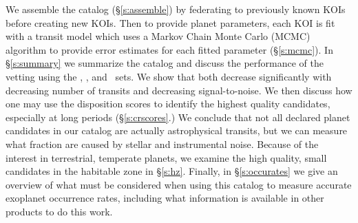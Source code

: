 We assemble the catalog (\S\ref{s:assemble}) by federating to previously known KOIs before creating new KOIs. Then to provide planet parameters, each KOI is fit with a transit model which uses a Markov Chain Monte Carlo (MCMC) algorithm to provide error estimates for each fitted parameter (\S\ref{s:mcmc}). In \S\ref{s:summary} we summarize the catalog and discuss the performance of the vetting using the \injtce, \invtce, and \scrtce\ sets. We show that both decrease significantly with decreasing number of transits and decreasing signal-to-noise.  We then discuss how one may use the disposition scores to identify the highest quality candidates, especially at long periods (\S\ref{s:crscores}.)  We conclude that not all declared planet candidates in our catalog are actually astrophysical transits, but we can measure what fraction are caused by stellar and instrumental noise. Because of the interest in terrestrial, temperate planets, we examine the high quality, small candidates in the habitable zone in \S\ref{s:hz}. Finally, in \S\ref{s:occurates} we give an overview of what must be considered when using this catalog to measure accurate exoplanet occurrence rates, including what information is available in other \Kepler{} products to do this work. 



